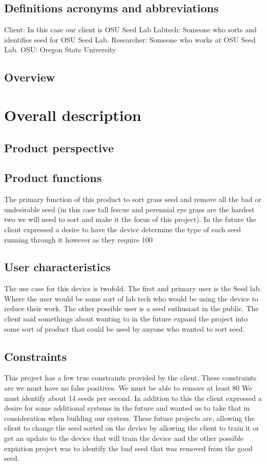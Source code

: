 \documentclass[onecolumn, draftclsnofoot,10pt, compsoc]{IEEEtran}
\begin{document}
\subsection{Definitions acronyms and abbreviations}
Client: In this case our client is OSU Seed Lab
Labtech: Someone who sorts and identifies seed for OSU Seed Lab.
Researcher: Someone who works at OSU Seed Lab.
OSU: Oregon State University
\subsection{Overview}


\section{Overall description}

\subsection{Product perspective}

\subsection{Product functions}
The primary function of this product to sort grass seed and remove all the bad or undesirable seed (in this case tall fescue and perennial rye grass are the hardest two we will need to sort and make it the focus of this project).
In the future the client expressed a desire to have the device determine the type of each seed running through it however as they require 100%

\subsection{User characteristics}
The use case for this device is twofold.
The first and primary user is the Seed lab.
Where the user would be some sort of lab tech who would be using the device to reduce their work.
The other possible user is a seed enthusiast in the public.
The client said somethings about wanting to in the future expand the project into some sort of product that could be used by anyone who wanted to sort seed.

\subsection{Constraints}
This project has a few true constraints provided by the client.
These constraints are we must have no false positives. We must be able to remove at least 80%
We must identify about 14 seeds per second.
In addition to this the client expressed a desire for some additional systems in the future and wanted us to take that in consideration when building our system.
These future projects are, allowing the client to change the seed sorted on the device by allowing the client to train it or get an update to the device that will train the device and the other possible expiation project was to identify the bad seed that was removed from the good seed.
\end{document}
